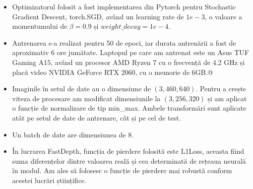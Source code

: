 \documentclass[12pt,a4paper]{report}
\begin{document}
\begin{itemize}
\item Optimizatorul folosit a fost implementarea din Pytorch pentru Stochastic Gradient Descent,
torch.SGD, având un learning rate de $ 1e-3 $, o valoare a momentumului de $ \beta=0.9 $ și
$ weight\_decay=1e-4 $.
\item Antrenarea s-a realizat pentru 50 de epoci, iar durata antrenării a fost de aproximativ
6 ore jumătate. Laptopul pe care am antrenat este un Asus TUF Gaming A15, având un procesor AMD Ryzen 7 cu o frecvență
de 4.2 GHz și placă video NVIDIA GeForce RTX 2060, cu o memorie de 6GB.@
\item Imaginile în setul de date au o dimensiune de $ (3, 460, 640) $. Pentru a crește viteza de procesare
am modificat dimensiunile la $ (3, 256, 320) $ și am aplicat o funcție de normalizare de tip min\_max. Ambele
transformări sunt aplicate atât pe setul de date de antrenare, cât și pe cel de test.
\item Un batch de date are dimensiunea de 8.
\item În lucrarea FastDepth, funcția de pierdere folosită este L1Loss, aceasta fiind suma diferențelor dintre valoarea
reală și cea determinată de rețeaua neurală în modul. Am ales să folosesc o funcție de pierdere
mai robustă conform acestei lucrări științifice\cite{lossfunctionidea}.
\end{itemize}
\end{document}
